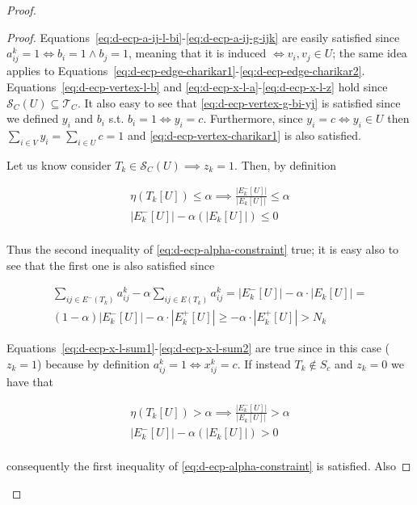 \begin{proof}
\begin{proof}
		Equations~\ref{eq:d-ecp-a-ij-l-bi}-\ref{eq:d-ecp-a-ij-g-ijk} are easily
		satisfied since $a_{ij}^{k} = 1 \iff b_i = 1 \land b_j = 1$, meaning
		that it is induced $\iff v_i, v_j \in U$; the same idea applies to
		Equations~\ref{eq:d-ecp-edge-charikar1}-\ref{eq:d-ecp-edge-charikar2}.
		Equations~\ref{eq:d-ecp-vertex-l-b} and
		\ref{eq:d-ecp-x-l-a}-\ref{eq:d-ecp-x-l-z} hold since
		$\mathcal{S}_C(U) \subseteq \mathcal{T}_C $. It also easy to see that
		\autoref{eq:d-ecp-vertex-g-bi-yj} is satisfied since we defined $y_i$
		and $b_i$ s.t. $b_i = 1 \iff y_i = c$. Furthermore, since $y_i = c \iff
			y_i \in U$ then $ \sum^{}_{i \in V} y_i = \sum^{}_{i \in U} c = 1$
		and \autoref{eq:d-ecp-vertex-charikar1} is also satisfied.

		Let us know consider $T_k \in \mathcal{S}_C(U) \implies z_k = 1$. Then, by definition

		\begin{gather}
			\eta(T_k[U]) \leq \alpha \implies
			\frac{|E^{-}_{k}[U]|}{|E_{k}[U]|} \leq \alpha \\
			|E^{-}_{k}[U]| - \alpha (|E_{k}[U]|) \leq 0 \\
		\end{gather}

		Thus the second inequality of \autoref{eq:d-ecp-alpha-constraint} true;
		it is easy also to see that the first one is also satisfied since

		\begin{multline}
			\sum^{}_{ij \in E^{-} (T_k)} a_{ij}^{k}  - \alpha \sum^{}_{ij \in E(T_k)}
			a_{ij} ^{k} = |E^{-}_{k}[U]| - \alpha \cdot |E_{k}[U]| = \\
			(1- \alpha)|E^{-}_{k}[U]| - \alpha \cdot |E^{+}_{k}[U]| \geq -
			\alpha \cdot |E^{+}_{k}[U]| > N_k
		\end{multline}

		Equations~\ref{eq:d-ecp-x-l-sum1}-\ref{eq:d-ecp-x-l-sum2} are true
		since in this case ($z_k = 1$) because by definition $a_{ij}^{k} = 1
			\iff x_{ij}^{k} = c$. If instead $T_k \not\in S_c$ and $z_k = 0$ we
		have that

		\begin{gather}
			\eta(T_k[U]) > \alpha \implies
			\frac{|E^{-}_{k}[U]|}{|E_{k}[U]|} > \alpha \\
			|E^{-}_{k}[U]| - \alpha (|E_{k}[U]|) > 0 \\
		\end{gather}

		consequently the first inequality of
		\autoref{eq:d-ecp-alpha-constraint} is satisfied. Also


\end{proof}
\end{proof}
